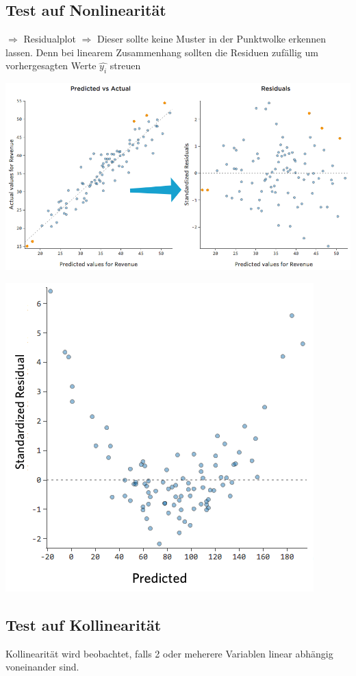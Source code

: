 \documentclass[10pt]{report}
\theoremstyle{definition}
\begin{document}
\subsection{Test auf Nonlinearität}
$\Rightarrow$ Residualplot
$\Rightarrow$ Dieser sollte keine Muster in der Punktwolke erkennen lassen. Denn bei linearem Zusammenhang sollten die Residuen zufällig um vorhergesagten Werte $\hat{y_i}$ streuen

\includegraphics[scale=0.4]{VorlesungenTexDateien/images/residual}
       
\includegraphics[scale=0.5]{VorlesungenTexDateien/images/Nonlinear-residual-11}

\subsection{Test auf Kollinearität}
Kollinearität wird beobachtet, falls 2 oder meherere Variablen linear abhängig voneinander sind.
\end{document}
